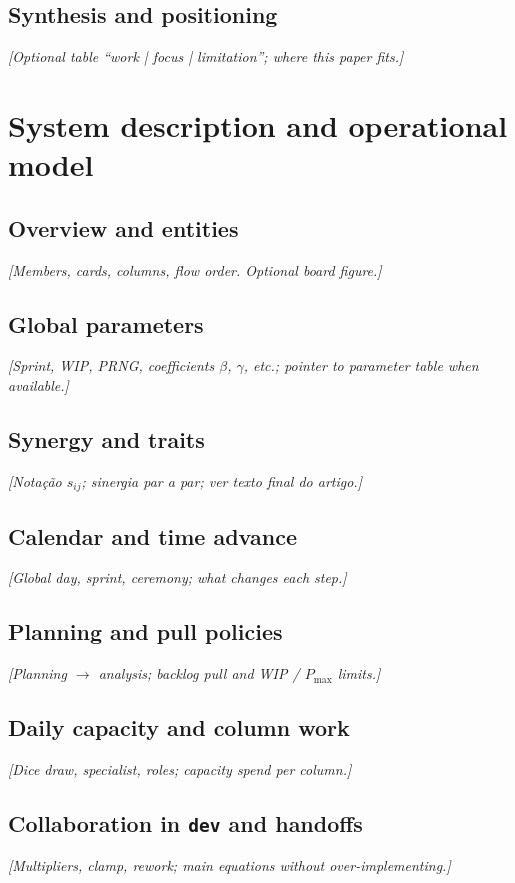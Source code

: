 \subsection{Synthesis and positioning}
\textit{[Optional table ``work | focus | limitation''; where this paper fits.]}

\section{System description and operational model}
\label{sec:modelo}

\subsection{Overview and entities}
\textit{[Members, cards, columns, flow order. Optional board figure.]}

\subsection{Global parameters}
\textit{[Sprint, WIP, PRNG, coefficients $\beta$, $\gamma$, etc.; pointer to parameter table when available.]}

\subsection{Synergy and traits}
\textit{[Notação $s_{ij}$; sinergia par a par; ver texto final do artigo.]}

\subsection{Calendar and time advance}
\textit{[Global day, sprint, ceremony; what changes each step.]}

\subsection{Planning and pull policies}
\textit{[Planning $\rightarrow$ analysis; backlog pull and WIP / $P_{\max}$ limits.]}

\subsection{Daily capacity and column work}
\textit{[Dice draw, specialist, roles; capacity spend per column.]}

\subsection{Collaboration in \texttt{dev} and handoffs}
\textit{[Multipliers, clamp, rework; main equations without over-implementing.]}

